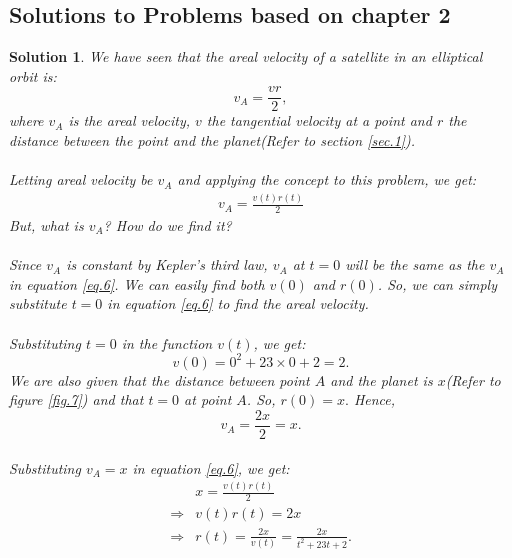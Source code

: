 \documentclass[a4paper]{report}
\newtheorem{solution}{Solution}
\begin{document}
\subsection{Solutions to Problems based on chapter 2}
\setcounter{solution}{0}
  \begin{solution} \normalfont
    We have seen that the areal velocity of a satellite in an elliptical orbit is:
    $$v_A=\frac{vr}{2},$$where $v_A$ is the areal velocity, $v$ the tangential velocity at a point and $r$ the
    distance between the point and the planet(Refer to section \ref{sec.1}).\\\\
    Letting areal velocity be $v_A$ and applying the concept to this problem, we get: 
    \begin{align} \label{eq.6}
      v_A=\frac{v(t)r(t)}{2}
    \end{align}
    But, what is $v_A$? How do we find it?\\\\
    Since $v_A$ is constant by Kepler's third law, $v_A$ at $t=0$ will be the same as the $v_A$ in equation 
    \ref{eq.6}.
    We can easily find both $v(0)$ and $r(0)$. So, we can simply substitute $t=0$ in equation \ref{eq.6} to 
    find the areal velocity. \\\\
    Substituting $t=0$ in the function $v(t)$, we get: $$v(0)=0^2+23\times 0 +2 = 2.$$
    We are also given that the distance between point $A$ and the planet is $x$(Refer to figure \ref{fig.7}) and 
    that $t=0$ at point $A$. So, $r(0)=x.$ Hence, $$v_A=\frac{2x}{2}=x.$$\\
    Substituting $v_A=x$ in equation \ref{eq.6}, we get: 
    \begin{align*}
      &x=\frac{v(t)r(t)}{2}\\
      \Rightarrow &v(t)r(t)=2x\\
      \Rightarrow &r(t)=\frac{2x}{v(t)}=\boxed{\frac{2x}{t^2+23t+2}}.
    \end{align*}
  \end{solution}
\end{document}
